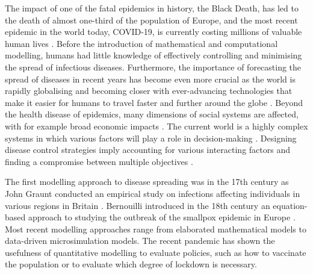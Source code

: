 \documentclass[smallextended]{svjour3}       %
\begin{document}
The impact of one of the fatal epidemics in history, the Black Death, has led to the death of almost one-third of the population of Europe, and the most recent epidemic in the world today, COVID-19, is currently costing millions of valuable human lives \cite{glatter2021history}. Before the introduction of mathematical and computational modelling, humans had little knowledge of effectively controlling and minimising the spread of infectious diseases. Furthermore, the importance of forecasting the spread of diseases in recent years has become even more crucial as the world is rapidly globalising and becoming closer with ever-advancing technologies that make it easier for humans to travel faster and further around the globe \cite{saker2004globalization}. Beyond the health disease of epidemics, many dimensions of social systems are affected, with for example broad economic impacts \cite{boucekkine2021economics}. The current world is a highly complex systems in which various factors will play a role in decision-making \cite{bickley2021does}. Designing disease control strategies imply accounting for various interacting factors and finding a compromise between multiple objectives \cite{kaszowska2022immunity}.

The first modelling approach to disease spreading was in the 17th century as John Graunt  conducted an empirical study on infections affecting individuals in various regions in Britain \cite{morabia2013epidemiology}. Bernouilli introduced in the 18th century an equation-based approach to studying the outbreak of the smallpox epidemic in Europe \cite{dietz2002daniel}. Most recent modelling approaches range from elaborated mathematical models to data-driven microsimulation models. The recent pandemic has shown the usefulness of quantitative modelling to evaluate policies, such as how to vaccinate the population \cite{bosetti2022epidemiology} or to evaluate which degree of lockdown is necessary.
\end{document}
